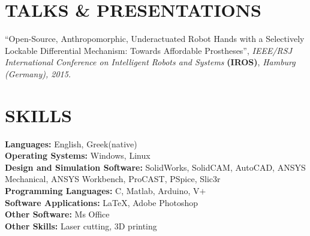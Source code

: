 \documentclass[11pt]{res} %
\begin{document}
\begin{resume}
\vspace{0in} %
\newpage
\section{TALKS \& PRESENTATIONS} 
\vspace{4pt} %
\textbf {\rbrack \hspace{0.05cm}}``Open-Source, Anthropomorphic, Underactuated Robot Hands with a Selectively Lockable Differential Mechanism: Towards Affordable Prostheses'',
{\it  IEEE/RSJ International Conference on Intelligent Robots and Systems} \small\textbf{(IROS)}, {\it Hamburg (Germany), 2015.}

\section{SKILLS} 
\vspace{4pt} %
\small \textbf  {Languages:} English, Greek(native) 
\\ \small \textbf  {Operating Systems:} Windows, Linux 
\\ \small \textbf {Design and Simulation Software:}
SolidWorks, SolidCAM, AutoCAD, ANSYS Mechanical, ANSYS Workbench, ProCAST, PSpice, Slic3r
\\ \small \textbf {Programming Languages:} C, Matlab, Arduino, V$+$ 
\\ \small \textbf {Software Applications:} \LaTeX, Adobe Photoshop
\\ \small \textbf {Other Software:} Ms Office
\\ \small \textbf {Other Skills:} Laser cutting, 3D printing
\vspace{0.1in} %

\end{resume}
\end{document}
